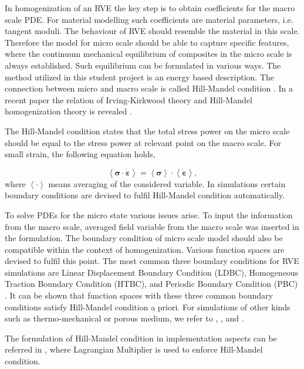 \documentclass[10pt,a4paper]{scrreprt}
\begin{document}
In homogenization of an RVE the key step is to obtain coefficients for the macro scale PDE. For material modelling such coefficients are material parameters, i.e. tangent moduli. The behaviour of RVE should resemble the material in this scale. Therefore the model for micro scale should be able to capture specific features, where the continuum mechanical equilibrium of composites in the micro scale is always established. Such equilibrium can be formulated in various ways. The method utilized in this student project is an energy based description. The connection between micro and macro scale is called Hill-Mandel condition \citep{hill_essential_1967}. In a recent paper the relation of Irving-Kirkwood theory and Hill-Mandel homogenization theory is revealed \citep{mercer_novel_2015}.

The Hill-Mandel condition states that the total stress power on the micro scale should be equal to the stress power at relevant point on the macro scale. For small strain, the following equation holds,

\begin{equation}
\left< \bm{\sigma} \cdot \dot{\bm{\varepsilon}} \right> = \left< \bm{\sigma} \right> \cdot \left< \dot{\bm{\varepsilon}} \right>,
\end{equation}
where $\left< \cdot \right>$ means averaging of the considered variable. In simulations certain boundary conditions are devised to fulfil Hill-Mandel condition automatically. 

To solve PDEs for the micro state various issues arise. To input the information from the macro scale, averaged field variable from the macro scale was inserted in the formulation. The boundary condition of micro scale model should also be compatible within the context of homogenization. Various function spaces are devised to fulfil this point. The most common three boundary conditions for RVE simulations are Linear Displacement Boundary Condition (LDBC), Homogeneous Traction Boundary Condition (HTBC), and Periodic Boundary Condition (PBC) \citep{gluge2012comparison}. It can be shown that function spaces with these three common boundary conditions satisfy Hill-Mandel condition a priori. For simulations of other kinds such as thermo-mechanical or porous medium, we refer to \citep{mandadapu_homogenization_2012}, \citep{ozdemir_computational_2008}, and \citep{gray_solid_2009}.

The formulation of Hill-Mandel condition in implementation aspects can be referred in \citep{miehe_computational_2002}, where Lagrangian Multiplier is used to enforce Hill-Mandel condition.
\end{document}
